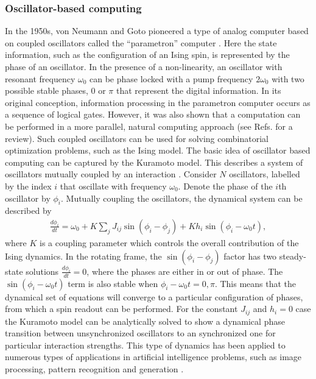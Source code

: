 \documentclass[fleqn,10pt]{wlscirep}
\def\fromNM#1{{\color{blue}\small{\bf } {\em #1}}}
\def\change#1{#1}
\begin{document}
\subsubsection*{Oscillator-based computing}
In the 1950s, von Neumann and Goto pioneered a type of analog computer based on coupled oscillators called the ``parametron'' computer \cite{von1957non,wigington1959new,goto1959parametron}.  Here the state information, such as the configuration of an Ising spin, is represented by the phase of an oscillator. In the presence of a non-linearity, an oscillator with resonant frequency $ \omega_0 $ can be phase locked with a pump frequency $ 2 \omega_0 $ with two possible stable phases, $ 0 $ or $ \pi$ that represent the digital information.  
In its original conception, information processing in the parametron computer occurs as a sequence of logical gates.  However, it was also shown that a computation can be performed in a more parallel, natural computing approach (see Refs.  \cite{csaba2020coupled,raychowdhury2018computing} for a review). Such coupled oscillators can be used for solving combinatorial optimization problems, such as the Ising model.
The basic idea of oscillator based computing can be captured by the Kuramoto model. This describes a system of oscillators mutually coupled by an interaction \cite{kuramoto1975international,acebron2005kuramoto,breakspear2010generative}.  Consider $ N $ oscillators, labelled by the index $ i $ that oscillate with frequency $ \omega_0 $.  Denote the phase of the $i$th oscillator by $ \phi_i $.  Mutually coupling the 
oscillators, the dynamical system can be described by \change{
%
\begin{align}
\frac{d \phi_i}{dt} = \omega_0 + K \sum_{j} J_{ij} \sin ( \phi_i - \phi_j) + K h_i \sin ( \phi_i - \omega_0 t ) ,
\label{kuramoto}
\end{align}
%
where $K $ is a coupling parameter which controls the overall contribution of the Ising dynamics.  
In the rotating frame,  the $ \sin ( \phi_i - \phi_j) $ factor has two steady-state solutions $ \frac{d \phi_i}{dt} = 0 $, where the phases are either in or out of phase. The $  \sin ( \phi_i  - \omega_0 t )  $ term is also stable when $ \phi_i - \omega_0 t = 0,\pi$. } This means that the dynamical set of equations will converge to a particular configuration of phases, from which a spin readout can be performed.  For the constant  $ J_{ij} $ and $ h_i = 0 $ case the Kuramoto model can be analytically solved to show a dynamical phase transition between unsynchronized oscillators to an synchronized one for particular interaction strengths. This type of dynamics has been applied to numerous types of applications in artificial intelligence problems, such as image processing, pattern recognition and generation  \cite{csaba2020coupled,raychowdhury2018computing}.  
\end{document}
